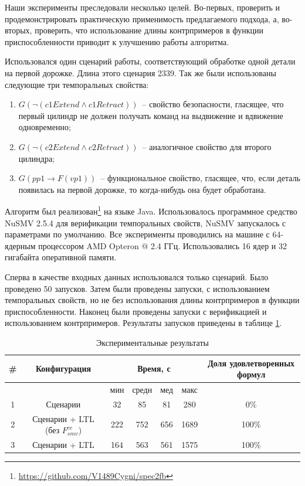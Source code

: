 \documentclass[14pt]{article}
\begin{document}
Наши эксперименты преследовали несколько целей. Во-первых, проверить и
продемонстрировать практическую применимость предлагаемого подхода, а, во-вторых,
проверить, что использование длины контрпримеров в функции приспособленности
приводит к улучшению работы алгоритма.

Использовался один сценарий работы, соответствующий обработке одной детали на
первой дорожке. Длина этого сценария 2339. Так же были использованы
следующие три темпоральных свойства:
\begin{enumerate}
    \item $G(\lnot (c1Extend \wedge c1Retract))$~-- свойство безопасности, гласящее, что
первый цилиндр не должен получать команд на выдвижение и вдвижение одновременно;
    \item $G(\lnot (c2Extend \wedge c2Retract))$~-- аналогичное свойство для второго цилиндра;
    \item $G(pp1 \rightarrow F(vp1))$~-- функциональное свойство, гласящее, что, если деталь
появилась на первой дорожке, то когда-нибудь она будет обработана.
\end{enumerate}

Алгоритм был реализован\footnote{\url{https://github.com/V1489Cygni/spec2fb}} на языке Java.
Использовалось программное средство NuSMV 2.5.4 для верификации
темпоральных свойств, NuSMV запускалось с параметрами по умолчанию. Все эксперименты
проводились на машине с 64-ядерным процессором AMD Opteron @ 2.4 ГГц.
Использовались 16 ядер и 32 гигабайта оперативной памяти.

Сперва в качестве входных данных использовался только сценарий. Было проведено 50 запусков.
Затем были проведены запуски, с использованием темпоральных свойств, но не без использования длины
контрпримеров в функции приспособленности. Наконец были проведены запуски с верификацией и использованием контрпримеров.
Результаты запусков приведены в таблице \ref{results-table}.

\begin{table}[t]
\centering
\caption{Экспериментальные результаты}
\label{results-table}
\begin{tabular}{c|c|c|c|c|c|c}
\hline
\# & Конфигурация & \multicolumn{4}{c|}{Время, с} & Доля удовлетворенных формул\\
\hline
 &              & мин & средн & мед & макс & \\
\hline
1 & Сценарии                            & 32       & 85        & 81          & 280  & 0\%\\
2 & Сценарии + LTL (без $F_{smv}^{ce}$) & 222      & 752       & 656         & 1689 & 100\%\\   
3 & Сценарии + LTL                      & 164      & 563       & 561         & 1575 & 100\%\\
\hline
\end{tabular}
\end{table}
\end{document}
